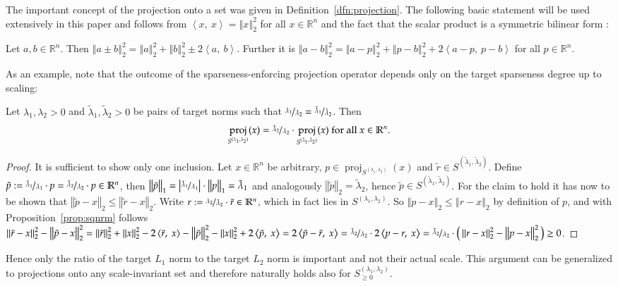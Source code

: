 \documentclass[twoside,11pt]{article}
\DeclareMathOperator{\proj}{proj}
\newcommand{\R}{\mathbb{R}}
\newcommand{\0}{\mathcal{O}}
\newcommand{\norm}[1]{\left\Vert#1\right\Vert}
\newcommand{\abs}[1]{\left\vert #1 \right\vert}
\newcommand{\scp}[2]{\left<#1,\ #2\right>}
\begin{document}
The important concept of the projection onto a set was given in Definition~\ref{dfn:projection}.
The following basic statement will be used extensively in this paper and follows from $\scp{x}{x} = \norm{x}_2^2$ for all $x\in\R^n$ and the fact that the scalar product is a symmetric bilinear form \citep{Laub2004}:
\begin{proposition}
\label{prop:sqnrm}
Let $a,b\in\R^n$.
Then $\norm{a\pm b}_2^2 = \norm{a}_2^2 + \norm{b}_2^2 \pm 2\scp{a}{b}$.
Further it is $\norm{a - b}_2^2 = \norm{a - p}_2^2 + \norm{p - b}_2^2 + 2\scp{a - p}{p - b}$ for all $p\in\R^n$.
\end{proposition}
As an example, note that the outcome of the sparseness-enforcing projection operator depends only on the target sparseness degree up to scaling:
\begin{remark}
\label{rem:projfunc_scaling}
Let $\lambda_1, \lambda_2 > 0$ and $\tilde{\lambda}_1, \tilde{\lambda}_2 > 0$ be pairs of target norms such that $\nicefrac{\lambda_1}{\lambda_2} = \nicefrac{\tilde{\lambda}_1}{\tilde{\lambda}_2}$.
Then
\begin{displaymath}
  \proj_{S^{(\lambda_1,\lambda_2)}}(x) = \nicefrac{\tilde{\lambda}_2}{\lambda_2}\cdot\proj_{S^{(\tilde{\lambda}_1,\tilde{\lambda}_2)}}(x)\text{ for all }x\in\R^n\text{.}
\end{displaymath}
\end{remark}
\begin{proof}
It is sufficient to show only one inclusion.
Let $x\in\R^n$ be arbitrary, $p\in\proj_{S^{(\lambda_1,\lambda_2)}}(x)$ and $\tilde{r}\in S^{(\tilde{\lambda}_1,\tilde{\lambda}_2)}$.
Define $\tilde{p} := \nicefrac{\tilde{\lambda}_1}{\lambda_1}\cdot p = \nicefrac{\tilde{\lambda}_2}{\lambda_2}\cdot p\in\R^n$, then $\norm{\tilde{p}}_1 = \abs{\nicefrac{\tilde{\lambda}_1}{\lambda_1}}\cdot\norm{p}_1 = \tilde{\lambda}_1$ and analogously $\norm{\tilde{p}}_2 = \tilde{\lambda}_2$, hence $\tilde{p}\in S^{(\tilde{\lambda}_1,\tilde{\lambda}_2)}$.
For the claim to hold it has now to be shown that $\norm{\tilde{p} - x}_2 \leq \norm{\tilde{r} - x}_2$.
Write $r := \nicefrac{\lambda_2}{\tilde{\lambda}_2}\cdot\tilde{r}\in\R^n$, which in fact lies in $S^{(\lambda_1,\lambda_2)}$.
So $\norm{p - x}_2 \leq \norm{r - x}_2$ by definition of $p$,
and with Proposition~\ref{prop:sqnrm} follows
$\norm{\tilde{r} - x}_2^2 - \norm{\tilde{p} - x}_2^2
= \norm{\tilde{r}}_2^2 + \norm{x}_2^2 - 2\scp{\tilde{r}}{x} - \norm{\tilde{p}}_2^2 - \norm{x}_2^2 + 2\scp{\tilde{p}}{x}
= 2\scp{\tilde{p} - \tilde{r}}{x}
= \nicefrac{\tilde{\lambda}_2}{\lambda_2}\cdot 2\scp{p - r}{x}
= \nicefrac{\tilde{\lambda}_2}{\lambda_2}\cdot\big(\norm{r - x}_2^2 - \norm{p - x}_2^2\big)
\geq 0$.
\end{proof}
Hence only the ratio of the target $L_1$ norm to the target $L_2$ norm is important and not their actual scale.
This argument can be generalized to projections onto any scale-invariant set and therefore naturally holds also for $S_{\geq 0}^{(\lambda_1,\lambda_2)}$.
\end{document}
